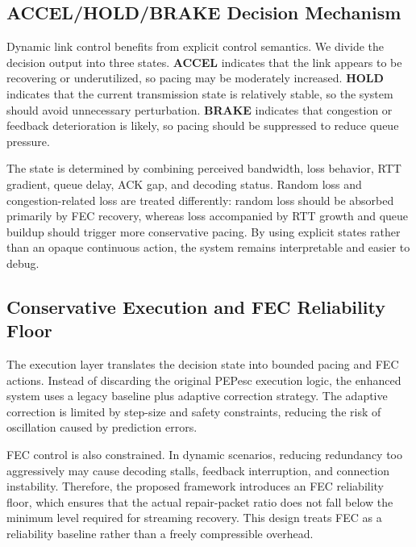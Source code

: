 \subsection{ACCEL/HOLD/BRAKE Decision Mechanism}
Dynamic link control benefits from explicit control semantics. We divide the decision output into three states. \textbf{ACCEL} indicates that the link appears to be recovering or underutilized, so pacing may be moderately increased. \textbf{HOLD} indicates that the current transmission state is relatively stable, so the system should avoid unnecessary perturbation. \textbf{BRAKE} indicates that congestion or feedback deterioration is likely, so pacing should be suppressed to reduce queue pressure.

The state is determined by combining perceived bandwidth, loss behavior, RTT gradient, queue delay, ACK gap, and decoding status. Random loss and congestion-related loss are treated differently: random loss should be absorbed primarily by FEC recovery, whereas loss accompanied by RTT growth and queue buildup should trigger more conservative pacing. By using explicit states rather than an opaque continuous action, the system remains interpretable and easier to debug.

\subsection{Conservative Execution and FEC Reliability Floor}
The execution layer translates the decision state into bounded pacing and FEC actions. Instead of discarding the original PEPesc execution logic, the enhanced system uses a legacy baseline plus adaptive correction strategy. The adaptive correction is limited by step-size and safety constraints, reducing the risk of oscillation caused by prediction errors.

FEC control is also constrained. In dynamic scenarios, reducing redundancy too aggressively may cause decoding stalls, feedback interruption, and connection instability. Therefore, the proposed framework introduces an FEC reliability floor, which ensures that the actual repair-packet ratio does not fall below the minimum level required for streaming recovery. This design treats FEC as a reliability baseline rather than a freely compressible overhead.
